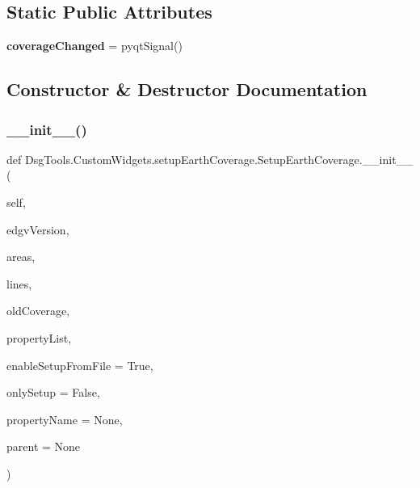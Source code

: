 \subsection*{Static Public Attributes}
\begin{DoxyCompactItemize}
\item 
\mbox{\label{class_dsg_tools_1_1_custom_widgets_1_1setup_earth_coverage_1_1_setup_earth_coverage_af1079711104519f7d4d6c07546a7d187}} 
{\bfseries coverage\+Changed} = pyqt\+Signal()
\end{DoxyCompactItemize}


\subsection{Constructor \& Destructor Documentation}
\mbox{\label{class_dsg_tools_1_1_custom_widgets_1_1setup_earth_coverage_1_1_setup_earth_coverage_a085d58c4d33be69f515a489ba9ff6a29}} 
\subsubsection{\texorpdfstring{\+\_\+\+\_\+init\+\_\+\+\_\+()}{\_\_init\_\_()}}
{\footnotesize\ttfamily def Dsg\+Tools.\+Custom\+Widgets.\+setup\+Earth\+Coverage.\+Setup\+Earth\+Coverage.\+\_\+\+\_\+init\+\_\+\+\_\+ (\begin{DoxyParamCaption}\item[{}]{self,  }\item[{}]{edgv\+Version,  }\item[{}]{areas,  }\item[{}]{lines,  }\item[{}]{old\+Coverage,  }\item[{}]{property\+List,  }\item[{}]{enable\+Setup\+From\+File = {\ttfamily True},  }\item[{}]{only\+Setup = {\ttfamily False},  }\item[{}]{property\+Name = {\ttfamily None},  }\item[{}]{parent = {\ttfamily None} }\end{DoxyParamCaption})}

